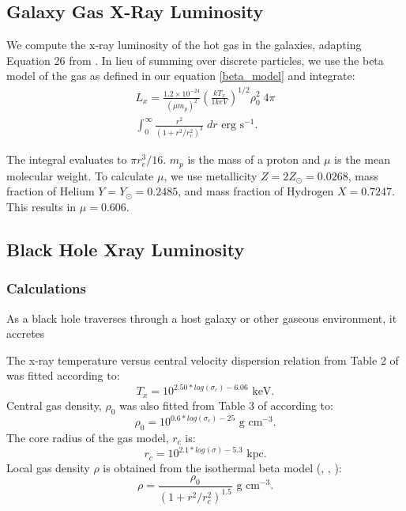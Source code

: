 \documentclass[fleqn,usenatbib,useAMS]{mnras}
\begin{document}
\subsection{Galaxy Gas X-Ray Luminosity}
We compute the x-ray luminosity of the hot gas in the galaxies, adapting Equation 26 from \citet{2012ApJ...754..125C}. In lieu of summing over discrete particles, we use the beta model of the gas as defined in our equation \ref{beta_model} and integrate:
\begin{equation}
\begin{aligned}
    L_x ={} \frac{1.2 \times 10^{-24}}{(\mu m_p)^2}\left(\frac{kT_x}{1keV}\right)^{1/2}\rho_0^{2}\;4{\pi} \\
    \int_{0}^{\infty}\frac{r^2}{(1+r^2/r_c^2)^{3}}\;dr\text{  erg s}^{-1}.
\end{aligned}
\end{equation}

The integral evaluates to ${\pi}r_c^3/16$.  $m_p$ is the mass of a proton and $\mu$ is the mean molecular weight.  To calculate $\mu$, we use metallicity $Z=2Z_{\odot}=0.0268$, mass fraction of Helium $Y=Y_{\odot}=0.2485$, and mass fraction of Hydrogen $X=0.7247$.  This results in $\mu=0.606$.

\subsection{Black Hole Xray Luminosity}
\subsubsection{Calculations}
As a black hole traverses through a host galaxy or other gaseous environment, it accretes 

The x-ray temperature versus central velocity dispersion relation from Table 2 of  \citet{2018ApJ...857...32B} was fitted according to:
\begin{equation}
    T_x = 10^{2.50*log(\sigma_c) - 6.06} \text{  keV}.
\end{equation}
Central gas density, ${\rho}_0$ was also fitted from Table 3 of \citet{2018ApJ...857...32B} according to:
\begin{equation}
    \rho_0 = 10^{0.6*log(\sigma_c) - 25} \text{  g cm}^{-3}.
\end{equation}
The core radius of the gas model, ${r_c}$ is:
\begin{equation}
    r_c = 10^{2.1*log(\sigma) - 5.3} \text{  kpc}.
\end{equation}
Local gas density ${\rho}$ is obtained from the isothermal beta model (\citet{1962AJ.....67..471K}, \citet{1976A&A....49..137C}, \citet{1978A&A....70..677C}):
\begin{equation} \label{beta_model}
    \rho = \frac{\rho_0}{(1+r^2/r_c^2)^{1.5}} \text{  g cm}^{-3}.
\end{equation}
\end{document}
